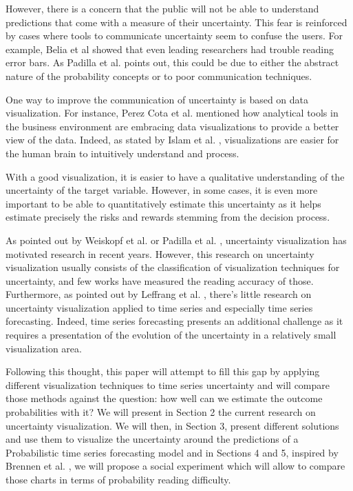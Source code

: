 \documentclass[a4paper,3p,sort&compress]{elsarticle}
\begin{document}
However, there is a concern that the public will not be able to understand
predictions that come with a measure of their uncertainty. This fear is
reinforced by cases where tools to communicate uncertainty seem to confuse the
users. For example, Belia et al \cite{belia_researchers_2005} showed that even
leading researchers had trouble reading error bars. As Padilla et al.
\cite{padilla_uncertainty_2021} points out, this could be due to either the
abstract nature of the probability concepts or to poor communication techniques.

One way to improve the communication of uncertainty is based on data
visualization. For instance, Perez Cota et al. \cite{cota_importance_2014}
mentioned how analytical tools in the business environment are embracing data
visualizations to provide a better view of the data. Indeed, as stated by Islam
et al. \cite{islam_overview_2019}, visualizations are easier for the human brain
to intuitively understand and process.

With a good visualization, it is easier to have a qualitative understanding of
the uncertainty of the target variable. However, in some cases, it is even more
important to be able to quantitatively estimate this uncertainty as it helps
estimate precisely the risks and rewards stemming from the decision process.

As pointed out by Weiskopf et al. \cite{weiskopf_uncertainty_2022} or Padilla et
al. \cite{padilla_uncertainty_2021}, uncertainty visualization has motivated
research in recent years. However, this research on uncertainty visualization
usually consists of the classification of visualization techniques for
uncertainty, and few works have measured the reading accuracy of those.
Furthermore, as pointed out by Leffrang et al. \cite{leffrang_should_2021},
there's little research on uncertainty visualization applied to time series and
especially time series forecasting. Indeed, time series forecasting presents an
additional challenge as it requires a presentation of the evolution of the
uncertainty in a relatively small visualization area.

Following this thought, this paper will attempt to fill this gap by applying
different visualization techniques to time series uncertainty and will compare
those methods against the question: how well can we estimate the outcome
probabilities with it? We will present in Section 2 the current research on
uncertainty visualization. We will then, in Section 3, present different
solutions and use them to visualize the uncertainty around the predictions of a
Probabilistic time series forecasting model and in Sections 4 and 5, inspired by
Brennen et al. \cite{brennen_instrument_2018}, we will propose a social
experiment which will allow to compare those charts in terms of probability
reading difficulty.
\end{document}
